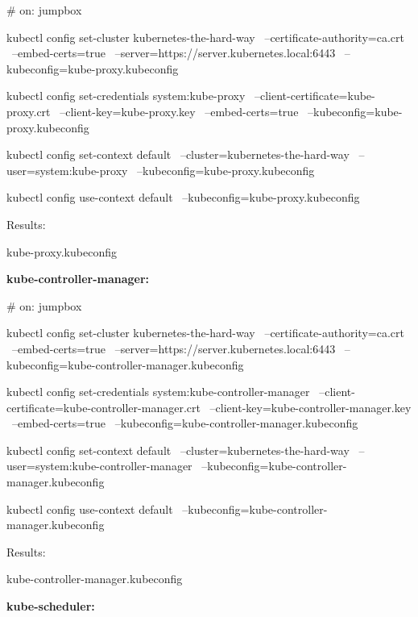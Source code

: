 \documentclass[11pt,oneside]{report}
\begin{document}
\begin{cmdlst}
# on: jumpbox
{
  kubectl config set-cluster kubernetes-the-hard-way \
    --certificate-authority=ca.crt \
    --embed-certs=true \
    --server=https://server.kubernetes.local:6443 \
    --kubeconfig=kube-proxy.kubeconfig

  kubectl config set-credentials system:kube-proxy \
    --client-certificate=kube-proxy.crt \
    --client-key=kube-proxy.key \
    --embed-certs=true \
    --kubeconfig=kube-proxy.kubeconfig

  kubectl config set-context default \
    --cluster=kubernetes-the-hard-way \
    --user=system:kube-proxy \
    --kubeconfig=kube-proxy.kubeconfig

  kubectl config use-context default \
    --kubeconfig=kube-proxy.kubeconfig
}
\end{cmdlst}

Results:

\begin{outlst}
kube-proxy.kubeconfig
\end{outlst}

\textbf{kube-controller-manager:}

\begin{cmdlst}
# on: jumpbox
{
  kubectl config set-cluster kubernetes-the-hard-way \
    --certificate-authority=ca.crt \
    --embed-certs=true \
    --server=https://server.kubernetes.local:6443 \
    --kubeconfig=kube-controller-manager.kubeconfig

  kubectl config set-credentials system:kube-controller-manager \
    --client-certificate=kube-controller-manager.crt \
    --client-key=kube-controller-manager.key \
    --embed-certs=true \
    --kubeconfig=kube-controller-manager.kubeconfig

  kubectl config set-context default \
    --cluster=kubernetes-the-hard-way \
    --user=system:kube-controller-manager \
    --kubeconfig=kube-controller-manager.kubeconfig

  kubectl config use-context default \
    --kubeconfig=kube-controller-manager.kubeconfig
}
\end{cmdlst}

Results:

\begin{outlst}
kube-controller-manager.kubeconfig
\end{outlst}

\textbf{kube-scheduler:}
\end{document}
